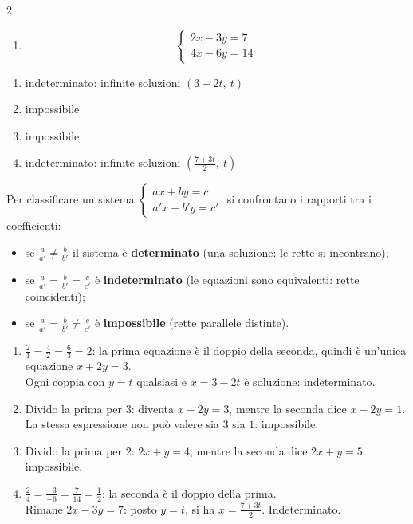 \begin{question}[ID=1.5, subtitle={Sistemi lineari: casi particolari}, difficulty=difficile, tags={sistemi, equazioni lineari}]
\begin{multicols}{2}
\begin{enumerate}[leftmargin=3.2cm]
    \item
    \[
    \begin{cases}
    2x-3y=7\\
    4x-6y=14
    \end{cases}
    \]
\end{enumerate}
\end{multicols}
\begin{solution}
\begin{enumerate}
    \item indeterminato: infinite soluzioni $(3-2t,\ t)$
    \item impossibile
    \item impossibile
    \item indeterminato: infinite soluzioni $\left(\tfrac{7+3t}{2},\ t\right)$
\end{enumerate}
\end{solution}
\begin{explanation}
Per classificare un sistema $\begin{cases} ax+by=c\\ a'x+b'y=c'\end{cases}$ si confrontano i rapporti tra i coefficienti:
\begin{itemize}
    \item se $\tfrac{a}{a'}\neq\tfrac{b}{b'}$ il sistema è \textbf{determinato} (una soluzione: le rette si incontrano);
    \item se $\tfrac{a}{a'}=\tfrac{b}{b'}=\tfrac{c}{c'}$ è \textbf{indeterminato} (le equazioni sono equivalenti: rette coincidenti);
    \item se $\tfrac{a}{a'}=\tfrac{b}{b'}\neq\tfrac{c}{c'}$ è \textbf{impossibile} (rette parallele distinte).
\end{itemize}
\begin{enumerate}
    \item $\tfrac21=\tfrac42=\tfrac63=2$: la prima equazione è il doppio della seconda, quindi è un'unica equazione $x+2y=3$. \\
    Ogni coppia con $y=t$ qualsiasi e $x=3-2t$ è soluzione: indeterminato.
    \item Divido la prima per $3$: diventa $x-2y=3$, mentre la seconda dice $x-2y=1$. La stessa espressione non può valere sia $3$ sia $1$: impossibile.
    \item Divido la prima per $2$: $2x+y=4$, mentre la seconda dice $2x+y=5$: impossibile.
    \item $\tfrac24=\tfrac{-3}{-6}=\tfrac7{14}=\tfrac12$: la seconda è il doppio della prima. \\
    Rimane $2x-3y=7$: posto $y=t$, si ha $x=\tfrac{7+3t}{2}$. Indeterminato.
\end{enumerate}
\end{explanation}
\end{question}


